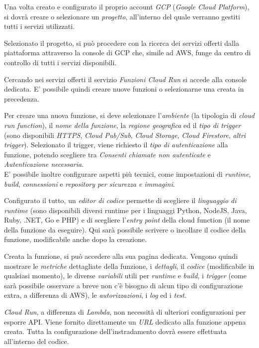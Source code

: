 Una volta creato e configurato il proprio account \textit{GCP} (\textit{Google Cloud Platform}), si dovrà creare o selezionare un \textit{progetto}, all'interno del quale verranno gestiti tutti i servizi utilizzati.

Selezionato il progetto, si può procedere con la ricerca dei servizi offerti dalla piattaforma attraverso la console di GCP che, simile ad AWS, funge da centro di controllo di tutti i servizi disponibili.

Cercando nei servizi offerti il servizio \textit{Funzioni Cloud Run} si accede alla console dedicata. E' possibile quindi creare nuove funzioni o selezionarne una creata in precedenza.

Per creare una nuova funzione, si deve selezionare l'\textit{ambiente} (la tipologia di \textit{cloud run function}), il \textit{nome della funzione}, la \textit{regione geografica} ed il \textit{tipo di trigger} (sono disponibili \textit{HTTPS}, \textit{Cloud Pub/Sub}, \textit{Cloud Storage}, \textit{Cloud Firestore}, \textit{altri trigger}). Selezionato il trigger, viene richiesto il \textit{tipo di autenticazione} alla funzione, potendo scegliere tra \textit{Consenti chiamate non autenticate} e \textit{Autenticazione necessaria}.\\
E' possibile inoltre configurare aspetti più tecnici, come impostazioni di \textit{runtime}, \textit{build}, \textit{connessioni} e \textit{repository per sicurezza e immagini}.

Configurato il tutto, un \textit{editor di codice} permette di scegliere il \textit{linguaggio di runtime} (sono disponibili diversi runtime per i linguaggi Python, NodeJS, Java, Ruby, .NET, Go e PHP) e di scegliere l'\textit{entry point} della cloud function (il nome della funzione da eseguire). Qui sarà possibile scrivere o incollare il codice della funzione, modificabile anche dopo la creazione.

Creata la funzione, si può accedere alla sua pagina dedicata. Vengono quindi mostrare le \textit{metriche} dettagliate della funzione, i \textit{dettagli}, il \textit{codice} (modificabile in qualsiasi momento), le diverse \textit{variabili} utili per \textit{runtime} e \textit{build}, i \textit{trigger} (come sarà possibile osservare a breve non c'è bisogno di alcun tipo di configurazione extra, a differenza di AWS), le \textit{autorizzazioni}, i \textit{log} ed i \textit{test}. 

\textit{Cloud Run}, a differenza di \textit{Lambda}, non necessità di ulteriori configurazioni per esporre API. Viene fornito direttamente un \textit{URL} dedicato alla funzione appena creata. Tutta la configurazione dell'instradamento dovrà essere effettuata all'interno del codice.
